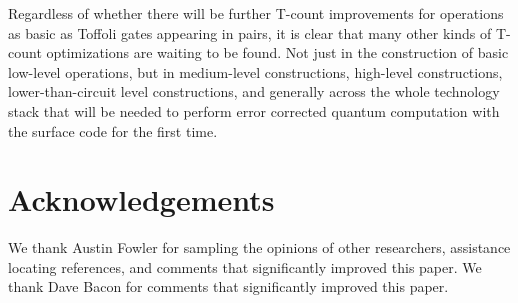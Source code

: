 \documentclass[twocolumn]{revtex4-1}
\begin{document}
Regardless of whether there will be further T-count improvements for operations as basic as Toffoli gates appearing in pairs, it is clear that many other kinds of T-count optimizations are waiting to be found.
Not just in the construction of basic low-level operations, but in medium-level constructions, high-level constructions, lower-than-circuit level constructions, and generally across the whole technology stack that will be needed to perform error corrected quantum computation with the surface code for the first time.


\section{Acknowledgements}

We thank Austin Fowler for sampling the opinions of other researchers, assistance locating references, and comments that significantly improved this paper.
We thank Dave Bacon for comments that significantly improved this paper.




\end{document}
